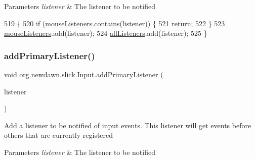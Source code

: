 \begin{DoxyParams}{Parameters}
{\em listener} & The listener to be notified \\
\hline
\end{DoxyParams}

\begin{DoxyCode}
519                                                               \{
520         \textcolor{keywordflow}{if} (\mbox{\hyperlink{classorg_1_1newdawn_1_1slick_1_1_input_a14f9c58eb48c498073f11c6934d92998}{mouseListeners}}.contains(listener)) \{
521             \textcolor{keywordflow}{return};
522         \}
523         \mbox{\hyperlink{classorg_1_1newdawn_1_1slick_1_1_input_a14f9c58eb48c498073f11c6934d92998}{mouseListeners}}.add(listener);
524         \mbox{\hyperlink{classorg_1_1newdawn_1_1slick_1_1_input_a26d5ed77d8b0444118d630336d0ab6d7}{allListeners}}.add(listener);
525     \}
\end{DoxyCode}
\mbox{\label{classorg_1_1newdawn_1_1slick_1_1_input_a939b8b7b6b5b5f84a2d0bd96fb26ecdb}} 
\subsubsection{\texorpdfstring{add\+Primary\+Listener()}{addPrimaryListener()}}
{\footnotesize\ttfamily void org.\+newdawn.\+slick.\+Input.\+add\+Primary\+Listener (\begin{DoxyParamCaption}\item[{\mbox{\hyperlink{interfaceorg_1_1newdawn_1_1slick_1_1_input_listener}{Input\+Listener}}}]{listener }\end{DoxyParamCaption})\hspace{0.3cm}{\ttfamily [inline]}}

Add a listener to be notified of input events. This listener will get events before others that are currently registered


\begin{DoxyParams}{Parameters}
{\em listener} & The listener to be notified \\
\hline
\end{DoxyParams}

